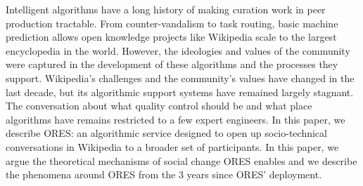 Intelligent algorithms have a long history of making curation work in peer production tractable.  From counter-vandalism to task routing, basic machine prediction allows open knowledge projects like Wikipedia scale to the largest encyclopedia in the world.  However, the ideologies and values of the community were captured in the development of these algorithms and the processes they support.  Wikipedia's challenges and the community's values have changed in the last decade, but its algorithmic support systems have remained largely stagnant.  The conversation about what quality control should be and what place algorithms have remains restricted to a few expert engineers.  In this paper, we describe ORES: an algorithmic service designed to open up socio-technical conversations in Wikipedia to a broader set of participants.  In this paper, we argue the theoretical mechanisms of social change ORES enables and we describe the phenomena around ORES from the 3 years since ORES' deployment.
